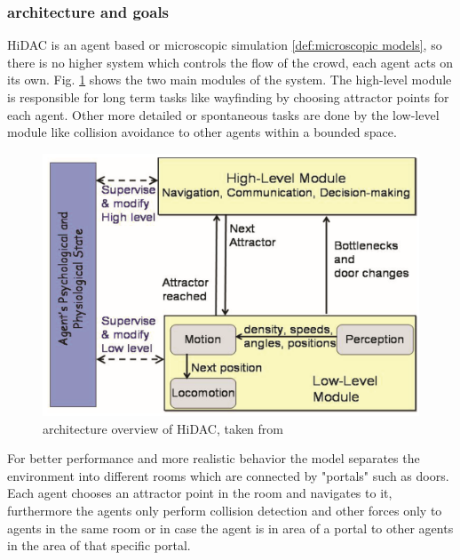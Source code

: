 \documentclass[sigconf]{acmart}
\begin{document}
\subsubsection{architecture and goals}
HiDAC is an agent based or microscopic simulation \ref{def:microscopic models}, so there is no higher system which controls the flow of the crowd, each agent acts on its own.
Fig. \ref{fig:hidacArchitecture} shows the two main modules of the system. The high-level module is responsible for long term tasks like wayfinding by choosing attractor points for each agent. Other more detailed or spontaneous tasks are done by the low-level module like collision avoidance to other agents  within a bounded space.
\begin{figure}[h]
  \centering
  \includegraphics[width=1\linewidth]{images/hidac-architacture.png}
  \caption{architecture overview of HiDAC,  taken from \cite{pelechano_controlling_2007}}
  \label{fig:hidacArchitecture}
\end{figure}
For better performance and more realistic behavior the model separates the environment into different rooms which are connected by "portals" such as doors. Each agent chooses an attractor point in the room and navigates to it, furthermore the agents only perform collision detection and other forces only to agents in the same room or in case the agent is in area of a portal to other agents in the area of that specific portal.
\end{document}
